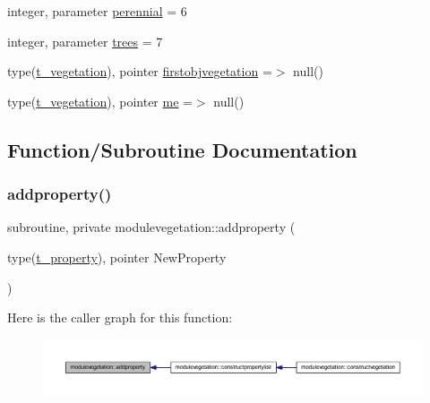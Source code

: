 \begin{DoxyCompactItemize}
\item 
integer, parameter \mbox{\hyperlink{namespacemodulevegetation_a96d9120624d107226156e706840efa11}{perennial}} = 6
\item 
integer, parameter \mbox{\hyperlink{namespacemodulevegetation_ad076c54f9b499254f3f80779270921a4}{trees}} = 7
\item 
type(\mbox{\hyperlink{structmodulevegetation_1_1t__vegetation}{t\+\_\+vegetation}}), pointer \mbox{\hyperlink{namespacemodulevegetation_aa55dc95d88d1f697796037ffc7ed34ae}{firstobjvegetation}} =$>$ null()
\item 
type(\mbox{\hyperlink{structmodulevegetation_1_1t__vegetation}{t\+\_\+vegetation}}), pointer \mbox{\hyperlink{namespacemodulevegetation_aeef5a5f66defced3e5aa3faa8fbed9ed}{me}} =$>$ null()
\end{DoxyCompactItemize}


\subsection{Function/\+Subroutine Documentation}
\mbox{\label{namespacemodulevegetation_a1831ceef19623bbd9a0c7d167abbb20e}} 
\subsubsection{\texorpdfstring{addproperty()}{addproperty()}}
{\footnotesize\ttfamily subroutine, private modulevegetation\+::addproperty (\begin{DoxyParamCaption}\item[{type(\mbox{\hyperlink{structmodulevegetation_1_1t__property}{t\+\_\+property}}), pointer}]{New\+Property }\end{DoxyParamCaption})\hspace{0.3cm}{\ttfamily [private]}}

Here is the caller graph for this function\+:\nopagebreak
\begin{figure}[H]
\begin{center}
\leavevmode
\includegraphics[width=350pt]{namespacemodulevegetation_a1831ceef19623bbd9a0c7d167abbb20e_icgraph}
\end{center}
\end{figure}
\mbox{\label{namespacemodulevegetation_ad22b2fa6cec4ffe4f2464f02624beca6}} 
